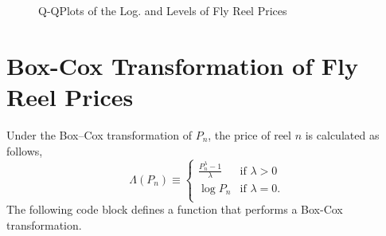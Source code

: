 \documentclass[11pt]{book}
\begin{document}
\begin{figure}[!ht]
\hfill
{}

\caption{Q-QPlots of the Log. and Levels of Fly Reel Prices}
\label{fig:qq_prices}
\end{figure}





\pagebreak
\section{Box-Cox Transformation of Fly Reel Prices}

Under the Box--Cox transformation of $P_n$, the price of reel $n$
is calculated as follows,
$$\Lambda(P_n)\equiv
  \begin{cases}
	\frac{P_n^\lambda-1}{\lambda}	& \textrm{if } \lambda > 0 \\
           \log P_n                     			& \textrm{if } \lambda = 0.\\
  \end{cases}
$$
The following code block defines a function that performs a
Box-Cox transformation.
\end{document}
